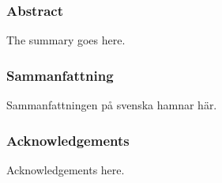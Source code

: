 \clearpage{\thispagestyle{empty}}
\begin{center}
	\subsubsection*{Abstract}
\end{center}
	The summary goes here. \lipsum[1][1-10]
	
\begin{center}
	\item\subsubsection*{Sammanfattning}
\end{center}
	Sammanfattningen på svenska hamnar här. \lipsum[2][1-10]

\begin{center}
	\item\subsubsection*{Acknowledgements}
\end{center}
	Acknowledgements here. \lipsum*[3][1-10]


